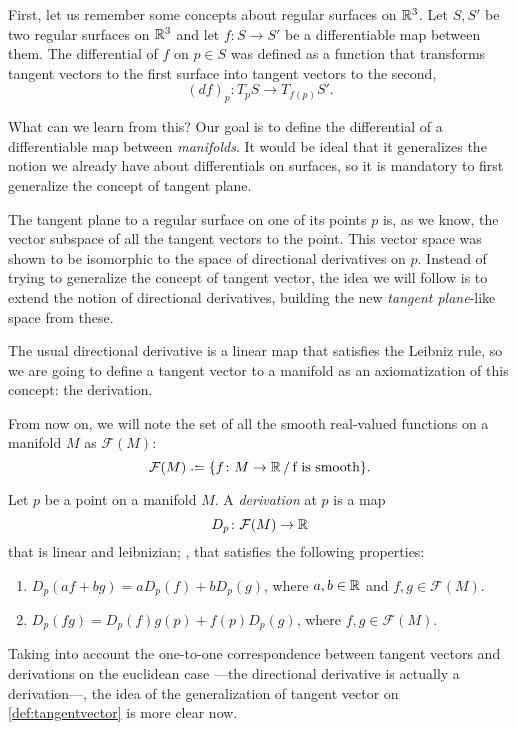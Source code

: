First, let us remember some concepts about regular surfaces on $\mathbb{R}^3$. Let $S, S'$ be two regular surfaces on $\mathbb{R}^3$ and let $f \colon S \to S'$ be a differentiable map between them. The differential of $f$ on $p \in S$ was defined as a function that transforms tangent vectors to the first surface into tangent vectors to the second,
\[
	(df)_p \colon T_p S \to T_{f(p)} S'.
\]

What can we learn from this? Our goal is to define the differential of a differentiable map between \emph{manifolds}. It would be ideal that it generalizes the notion we already have about differentials on surfaces, so it is mandatory to first generalize the concept of tangent plane.

The tangent plane to a regular surface on one of its points $p$ is, as we know, the vector subspace of all the tangent vectors to the point. This vector space was shown to be isomorphic to the space of directional derivatives on $p$. Instead of trying to generalize the concept of tangent vector, the idea we will follow is to extend the notion of directional derivatives, building the new \emph{tangent plane}-like space from these.

The usual directional derivative is a linear map that satisfies the Leibniz rule, so we are going to define a tangent vector to a manifold as an axiomatization of this concept: the derivation.

From now on, we will note the set of all the smooth real-valued functions on a manifold $M$ as $\mathcal{F}(M)$:
\[
\mathcal{F}(M) \defeq \{f \colon M \to \R \,/\, \textrm{f is smooth} \}.
\]

\begin{definition}[Derivation]
	Let $p$ be a point on a manifold $M$. A \emph{derivation} at $p$ is a map
	\[
		D_p \colon \mathcal{F}(M) \to \mathbb{R}
	\]
	that is linear and leibnizian; \ie, that satisfies the following properties:
	\begin{enumerate}
		\item $D_p(af + bg) = aD_p(f) + bD_p(g)$, where $a,b \in \mathbb{R}$ and $f,g \in \mathcal{F}(M)$.
		\item $D_p(fg) = D_p(f)g(p) + f(p)D_p(g)$, where $f,g \in \mathcal{F}(M)$.
	\end{enumerate}
\end{definition}

Taking into account the one-to-one correspondence between tangent vectors and derivations on the euclidean case ---the directional derivative is actually a derivation---, the idea of the generalization of tangent vector on \autoref{def:tangentvector} is more clear now.

